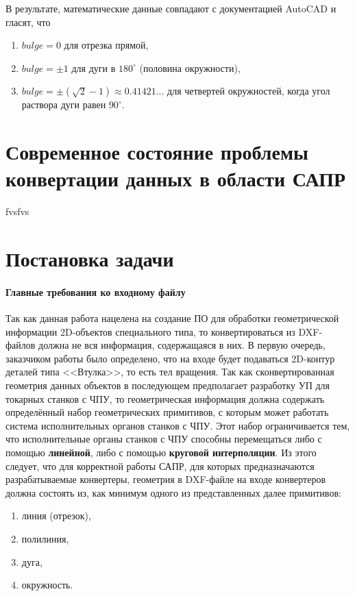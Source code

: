 В результате, математические данные совпадают с документацией AutoCAD \cite{autocad2012dxf} и гласят, что

\begin{enumerate}
	\item $bulge = 0$ для отрезка прямой,
	\item $bulge = \pm1$ для дуги в $180^{\circ}$ (половина окружности),
	\item $bulge = \pm(\sqrt2-1) \approx0.41421...$ для четвертей окружностей, когда угол раствора дуги равен $90^{\circ}$.
\end{enumerate}

\section{Современное состояние проблемы конвертации данных в области САПР}
fvsfvs

\section{Постановка задачи}

\paragraph{Главные требования ко входному файлу}

Так как данная работа нацелена на создание ПО для обработки геометрической информации 2D-объектов специального типа, то конвертироваться из DXF-файлов должна не вся информация, содержащаяся в них. В первую очередь, заказчиком работы было определено, что на входе будет подаваться 2D-контур деталей типа <<Втулка>>, то есть тел вращения. Так как сконвертированная геометрия данных объектов в последующем предполагает разработку УП для токарных станков с ЧПУ, то геометрическая информация должна содержать определённый набор геометрических примитивов, с которым может работать система исполнительных органов станков с ЧПУ. Этот набор ограничивается тем, что исполнительные органы станков с ЧПУ способны перемещаться либо с помощью \textbf{линейной}, либо с помощью \textbf{круговой интерполяции}. Из этого следует, что для корректной работы САПР, для которых предназначаются разрабатываемые конвертеры, геометрия в DXF-файле на входе конвертеров должна состоять из, как минимум одного из представленных далее примитивов:

\begin{enumerate}
	\item линия (отрезок),
	\item полилиния,
	\item дуга,
	\item окружность.
\end{enumerate}

